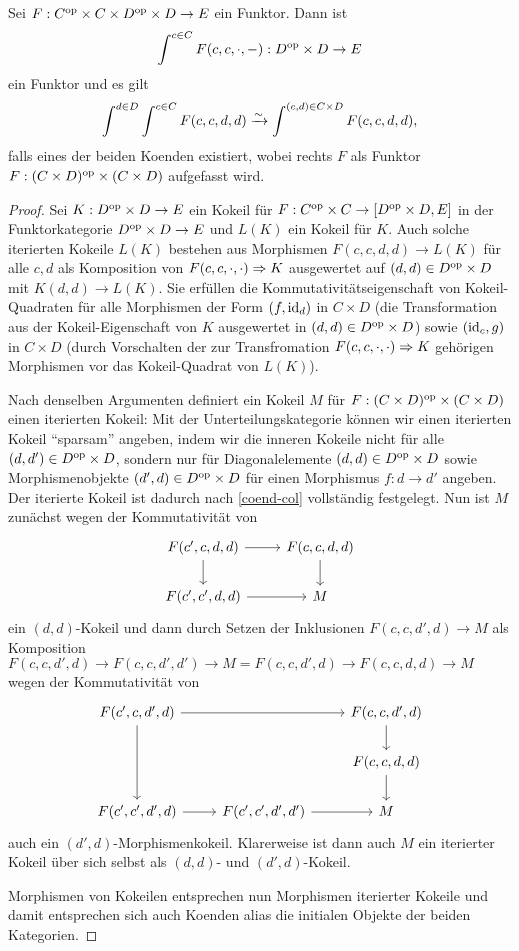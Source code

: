 \begin{lemma}
  Sei $F: C^\mathrm{op} \times C \times D^\mathrm{op} \times D \to E$ ein Funktor. Dann
  ist
  \[ \int^{c \in C} F(c, c, \cdot, -): D^\mathrm{op} \times D \to E \]
  ein Funktor und es gilt
  \[ \int^{d \in D} \int^{c \in C} F(c, c, d, d)
  \xrightarrow[]{\sim} \int^{(c, d) \in C \times D} F(c, c, d, d),
  \]
  falls eines der beiden Koenden existiert, wobei rechts $F$ als
  Funktor $F: (C \times D)^\mathrm{op} \times (C \times D)$ aufgefasst wird.
\end{lemma}
\begin{proof}
  Sei $K: D^\mathrm{op} \times D \to E$ ein Kokeil für $F: C^\mathrm{op} \times C \to
  [D^\mathrm{op} \times D, E]$ in der Funktorkategorie $D^\mathrm{op} \times D \to E$
  und $L(K)$ ein Kokeil für $K$. Auch solche iterierten Kokeile $L(K)$
  bestehen aus Morphismen $F(c, c, d, d) \to L(K)$ für alle $c, d$ als
  Komposition von $F(c, c, \cdot, \cdot) \Rightarrow K$ ausgewertet auf
  $(d, d) \in D^\mathrm{op} \times D$ mit $K(d, d) \to L(K)$. Sie erfüllen die
  Kommutativitätseigenschaft von Kokeil-Quadraten für alle Morphismen
  der Form $(f, \operatorname{id}_d)$ in $C \times D$ (die Transformation aus der
  Kokeil-Eigenschaft von $K$ ausgewertet in $(d, d) \in D^\mathrm{op} \times
  D$) sowie $(\operatorname{id}_c, g)$ in $C \times D$ (durch Vorschalten der zur
  Transfromation $F(c, c, \cdot, \cdot) \Rightarrow K$ gehörigen
  Morphismen vor das Kokeil-Quadrat von $L(K)$).

  Nach denselben Argumenten definiert ein Kokeil $M$ für $F: (C \times
  D)^\mathrm{op} \times (C \times D)$ einen iterierten Kokeil: Mit der
  Unterteilungskategorie können wir einen iterierten Kokeil
  ``sparsam'' angeben, indem wir die inneren Kokeile nicht für alle
  $(d, d') \in D^\mathrm{op} \times D$, sondern nur für Diagonalelemente $(d,
  d) \in D^\mathrm{op} \times D$ sowie Morphismenobjekte $(d', d) \in D^\mathrm{op}
  \times D$ für einen Morphismus $f: d \to d'$ angeben. Der iterierte
  Kokeil ist dadurch nach \ref{coend-col} vollständig festgelegt. Nun
  ist $M$ zunächst wegen der Kommutativität von
  \[ \begin{tikzcd}
    F(c', c, d, d) \arrow{r} \arrow{d} & F(c, c, d, d) \arrow{d} \\
    F(c', c', d, d) \arrow{r} & M
  \end{tikzcd} \]
  ein $(d, d)$-Kokeil und dann durch Setzen der Inklusionen $F(c, c,
  d', d) \to M$ als Komposition $F(c, c, d', d) \to F(c, c, d', d')
  \to M = F(c, c, d', d) \to F(c, c, d, d) \to M$ wegen der
  Kommutativität von
  \[ \begin{tikzcd}
    F(c', c, d', d) \arrow{rr} \arrow{dd} & & F(c, c, d', d) \arrow{d} \\
    & & F(c, c, d, d) \arrow{d} \\
    F(c', c', d', d) \arrow{r} & F(c', c', d', d') \arrow{r} & M
  \end{tikzcd} \]
  auch ein $(d', d)$-Morphismenkokeil. Klarerweise ist dann auch $M$
  ein iterierter Kokeil über sich selbst als $(d, d)$- und $(d',
  d)$-Kokeil.

  Morphismen von Kokeilen entsprechen nun Morphismen iterierter
  Kokeile und damit entsprechen sich auch Koenden alias die initialen
  Objekte der beiden Kategorien.
\end{proof}
